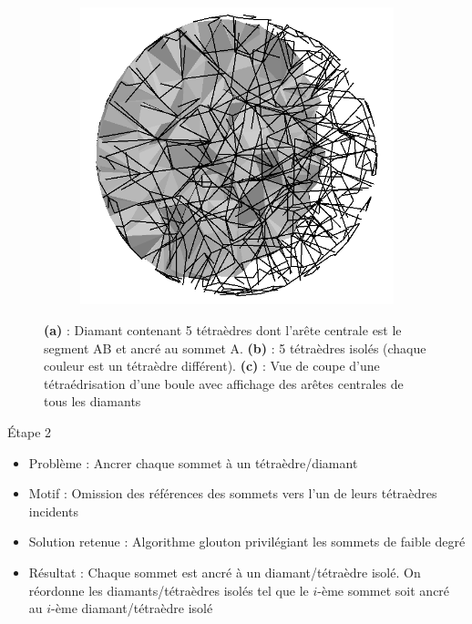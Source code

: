 \documentclass[9pt]{beamer}
\begin{document}
\begin{frame}
\begin{figure}[H]
\begin{subfigure}{.32\textwidth}
  \caption{}
  \label{fig:explosion_diamond}
\end{subfigure}
\begin{subfigure}{.32\textwidth}
  \centering
  \includegraphics[scale=0.12]{../Images/central_edges}
  \caption{}
\end{subfigure}
\caption{\textbf{(a)} : Diamant contenant 5 tétraèdres dont l'arête centrale est le segment AB et ancré au sommet A. \textbf{(b)} : 5 tétraèdres isolés (chaque couleur est un tétraèdre différent). \textbf{(c)} : Vue de coupe d'une tétraédrisation d'une boule avec affichage des arêtes centrales de tous les diamants}
\end{figure}

\begin{block}{\'{E}tape 2}
\begin{itemize}
\item Problème : Ancrer chaque sommet à un tétraèdre/diamant
\item Motif : Omission des références des sommets vers l'un de leurs tétraèdres incidents
\item Solution retenue : Algorithme glouton privilégiant les sommets de faible degré
\item Résultat : Chaque sommet est ancré à un diamant/tétraèdre isolé. On réordonne les diamants/tétraèdres isolés tel que le $i$-ème sommet soit ancré au $i$-ème diamant/tétraèdre isolé
\end{itemize}
\end{block}
\end{frame}
\end{document}
